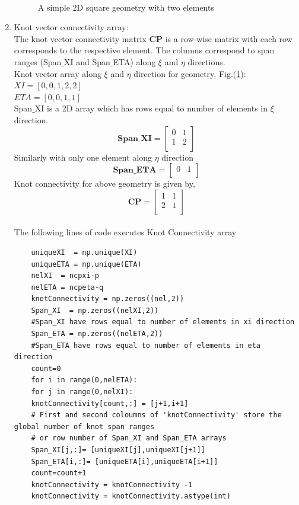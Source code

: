 \documentclass[11pt]{article}
\begin{document}
\begin{enumerate}[leftmargin=*]
\begin{figure}[H]
\begin{center}
			\caption{\\A simple 2D square geometry with two elements}\label{Element}
		\end{center}	
	\end{figure}
	\item Knot vector connectivity array: \\
	The knot vector connectivity matrix \textbf{CP} is a row-wise matrix with each row corresponds to the respective element. The columns correspond to span ranges (Span$\_$XI and Span$\_$ETA) along $\xi$ and $\eta$ directions. \\
	Knot vector array along $\xi$ and $\eta$ direction for geometry, Fig.(\ref{Element}): \\
	$XI  = [ 0, 0, 1, 2, 2 ]$ \\
	$ETA = [ 0, 0, 1, 1 ]$ \\
	Span$\_$XI is a 2D array which has rows equal to number of elements in $\xi$ direction.
	\begin{equation} \label{SpanXI}
	\textbf{Span\_XI} =
	\begin{bmatrix}
	0 & 1  \\
	1 & 2  \\
	\end{bmatrix}
	\end{equation}
	Similarly with only one element along $\eta$ direction
	\begin{equation} \label{SpanETA}
	\textbf{Span\_ETA} =
	\begin{bmatrix}
	0 & 1  \\
	\end{bmatrix}
	\end{equation}
	Knot connectivity for above geometry is given by,
	\begin{equation} \label{CP}
	\textbf{CP} =
	\begin{bmatrix}
	1 & 1  \\
	2 & 1  \\
	\end{bmatrix}
	\end{equation}
\\
	The following lines of code executes Knot Connectivity array
	\begin{verbatim}
	uniqueXI  = np.unique(XI)
	uniqueETA = np.unique(ETA)
	nelXI  = ncpxi-p
	nelETA = ncpeta-q
	knotConnectivity = np.zeros((nel,2)) 
	Span_XI  = np.zeros((nelXI,2))
	#Span_XI have rows equal to number of elements in xi direction
	Span_ETA = np.zeros((nelETA,2))
	#Span_ETA have rows equal to number of elements in eta direction
	count=0
	for i in range(0,nelETA):
	for j in range(0,nelXI):
	knotConnectivity[count,:] = [j+1,i+1] 
	# First and second coloumns of 'knotConnectivity' store the global number of knot span ranges
	# or row number of Span_XI and Span_ETA arrays
	Span_XI[j,:]= [uniqueXI[j],uniqueXI[j+1]]
	Span_ETA[i,:]= [uniqueETA[i],uniqueETA[i+1]]
	count=count+1
	knotConnectivity = knotConnectivity -1
	knotConnectivity = knotConnectivity.astype(int)
	\end{verbatim} 
	

\end{enumerate}
\end{document}
